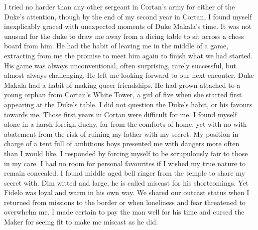 \documentclass{article}
\begin{document}
I tried no harder than any other sergeant in Cortan's army for either of the Duke's attention, though by the end of my second year in Cortan, I found myself inexplicably graced with unexpected moments of Duke Makala's time. It was not unusual for the duke to draw me away from a dicing table to sit across a chess board from him. He had the habit of leaving me in the middle of a game, extracting from me the promise to meet him again to finish what we had started. His game was always unconventional, often surprising, rarely successful, but almost always challenging. He left me looking forward to our next encouter. Duke Makala had a habit of making queer friendships. He had grown attached to a young orphan from Cortan's White Tower, a girl of five when she started first appearing at the Duke's table. I did not question the Duke's habit, or his favours towards me. Those first years in Cortan were difficult for me. I found myself alone in a harsh foreign duchy, far from the comforts of home, yet with no with abatement from the risk of ruining my father with my secret. My position in charge of a tent full of ambitious boys presented me with dangers more often than I would like. I responded by forcing myself to be scrupulously fair to those in my care. I had no room for personal favourites if I wished my true nature to remain concealed. I found middle aged bell ringer from the temple to share my secret with. Dim witted and large, he is called miscast for his shortcomings. Yet Fidelo was loyal and warm in his own way. We shared our outcast status when I returned from missions to the border or when loneliness and fear threatened to overwhelm me. I made certain to pay the man well for his time and cursed the Maker for seeing fit to make me miscast as he did.
\end{document}
